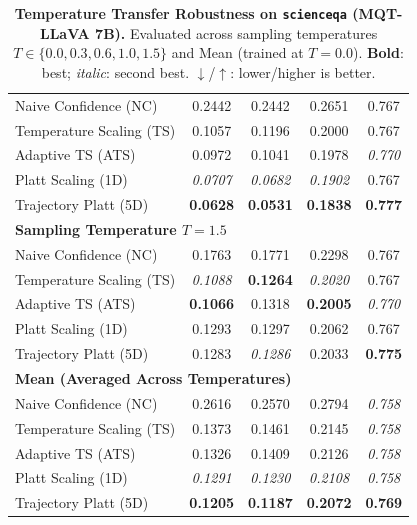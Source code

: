 \begin{table}[t]
{\begin{tabular}{lcccc}
\midrule
Naive Confidence (NC) & 0.2442 & 0.2442 & 0.2651 & 0.767 \\
Temperature Scaling (TS) & 0.1057 & 0.1196 & 0.2000 & 0.767 \\
Adaptive TS (ATS) & 0.0972 & 0.1041 & 0.1978 & \textit{0.770} \\
Platt Scaling (1D) & \textit{0.0707} & \textit{0.0682} & \textit{0.1902} & 0.767 \\
Trajectory Platt (5D) & \textbf{0.0628} & \textbf{0.0531} & \textbf{0.1838} & \textbf{0.777} \\
\midrule
\multicolumn{5}{l}{\textbf{Sampling Temperature $T = 1.5$}} \\
\midrule
Naive Confidence (NC) & 0.1763 & 0.1771 & 0.2298 & 0.767 \\
Temperature Scaling (TS) & \textit{0.1088} & \textbf{0.1264} & \textit{0.2020} & 0.767 \\
Adaptive TS (ATS) & \textbf{0.1066} & 0.1318 & \textbf{0.2005} & \textit{0.770} \\
Platt Scaling (1D) & 0.1293 & 0.1297 & 0.2062 & 0.767 \\
Trajectory Platt (5D) & 0.1283 & \textit{0.1286} & 0.2033 & \textbf{0.775} \\
\midrule
\multicolumn{5}{l}{\textbf{Mean (Averaged Across Temperatures)}} \\
\midrule
Naive Confidence (NC) & 0.2616 & 0.2570 & 0.2794 & \textit{0.758} \\
Temperature Scaling (TS) & 0.1373 & 0.1461 & 0.2145 & \textit{0.758} \\
Adaptive TS (ATS) & 0.1326 & 0.1409 & 0.2126 & \textit{0.758} \\
Platt Scaling (1D) & \textit{0.1291} & \textit{0.1230} & \textit{0.2108} & \textit{0.758} \\
Trajectory Platt (5D) & \textbf{0.1205} & \textbf{0.1187} & \textbf{0.2072} & \textbf{0.769} \\
\bottomrule
\end{tabular}%
}
\caption{\textbf{Temperature Transfer Robustness on \texttt{scienceqa} (MQT-LLaVA 7B).} Evaluated across sampling temperatures $T \in \{0.0, 0.3, 0.6, 1.0, 1.5\}$ and Mean (trained at $T=0.0$). \textbf{Bold}: best; \textit{italic}: second best. $\downarrow$/$\uparrow$: lower/higher is better.}
\label{tab:temp_transfer_mqt_scienceqa}
\end{table}
